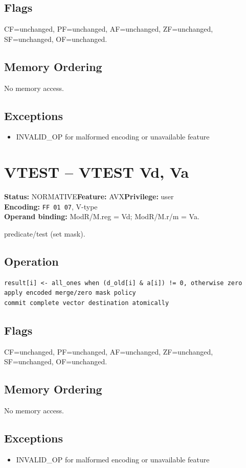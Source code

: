 \documentclass[10pt]{article}
\begin{document}
\subsection*{Flags}
CF=unchanged, PF=unchanged, AF=unchanged, ZF=unchanged, SF=unchanged, OF=unchanged.
\subsection*{Memory Ordering}
No memory access.
\subsection*{Exceptions}
\begin{itemize}
\item INVALID\_OP for malformed encoding or unavailable feature
\end{itemize}
\clearpage

\section{VTEST -- VTEST Vd, Va}
\textbf{Status:} NORMATIVE\quad \textbf{Feature:} AVX\quad \textbf{Privilege:} user\\
\textbf{Encoding:} \texttt{FF 01 07}, V-type\\
\textbf{Operand binding:} ModR/M.reg = Vd; ModR/M.r/m = Va.

predicate/test (set mask).

\subsection*{Operation}
\begin{lstlisting}
result[i] <- all_ones when (d_old[i] & a[i]) != 0, otherwise zero
apply encoded merge/zero mask policy
commit complete vector destination atomically
\end{lstlisting}
\subsection*{Flags}
CF=unchanged, PF=unchanged, AF=unchanged, ZF=unchanged, SF=unchanged, OF=unchanged.
\subsection*{Memory Ordering}
No memory access.
\subsection*{Exceptions}
\begin{itemize}
\item INVALID\_OP for malformed encoding or unavailable feature
\end{itemize}
\clearpage
\end{document}
